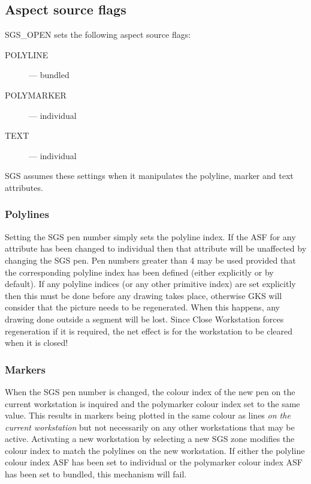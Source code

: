 \subsection* {Aspect source flags}

SGS\_OPEN sets the following aspect source flags:
\begin{description}
\begin{description}
\item [POLYLINE] --- bundled
\item [POLYMARKER] --- individual
\item [TEXT] --- individual
\end{description}
\end{description}
SGS assumes these settings when it manipulates the polyline, marker and text
attributes.

\subsubsection* {Polylines}

Setting the SGS pen number simply sets the polyline index.
If the ASF for any attribute has been changed to individual then that attribute
will be unaffected by changing the SGS pen.
Pen numbers greater than 4 may be used provided that the corresponding polyline
index has been defined (either explicitly or by default).
If any polyline indices (or any other primitive index) are set explicitly then
this must be done before any drawing takes place, otherwise GKS will consider
that the picture needs to be regenerated.
When this happens, any drawing done outside a segment will be lost.
Since Close Workstation forces regeneration if it is required, the net effect is
for the workstation to be cleared when it is closed!

\subsubsection* {Markers}

When the SGS pen number is changed, the colour index of the new pen on the
current workstation is inquired and the polymarker colour index set to the same
value.
This results in markers being plotted in the same colour as lines {\em on the
current workstation} but not necessarily on any other workstations that may be
active.
Activating a new workstation by selecting a new SGS zone modifies the colour
index to match the polylines on the new workstation.
If either the polyline colour index ASF has been set to individual or the
polymarker colour index ASF has been set to bundled, this mechanism will fail.

